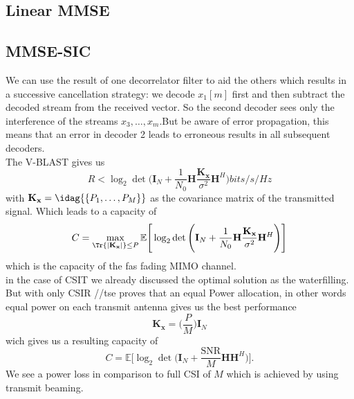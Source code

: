\subsection{Linear MMSE}
\subsection{MMSE-SIC}
We can use the result of one decorrelator filter to aid the others which results in a successive cancellation strategy: we decode $x_1[m]$ first and then subtract the decoded stream from the received vector. So the second decoder sees only the interference of the streams $x_3,\dots,x_m$.But be aware of error propagation, this means that an error in decoder 2 leads to erroneous results in all subsequent decoders.\\
The V-BLAST gives us
\begin{equation}
	R<\log_2{\det{\Biggr(\mathbf{I}_N+\frac{1}{N_0}\mathbf{H}\frac{\mathbf{K_x}}{\sigma^2}\mathbf{H}^H\Biggl)}} bits/s/Hz
\end{equation}
with $\mathbf{K_x} = \idag{\{P_1,\dots,P_M\}}$ as the covariance matrix of the transmitted signal. Which leads to a capacity of
\begin{equation}
	C = \max_{\Tr{|\mathbf{K_x}|}\leq P}{\mathbb{E}\Biggr[\log_2{\det{\Biggr(\mathbf{I}_N+\frac{1}{N_0}\mathbf{H}\frac{\mathbf{K_x}}{\sigma^2}\mathbf{H}^H\Biggl)}}\Biggl]}
\end{equation}
which is the capacity of the fas fading MIMO channel.\\
in the case of CSIT we already discussed the optimal solution as the waterfilling. But with only CSIR //tse proves that an equal Power allocation, in other words equal power on each transmit antenna gives us the best performance
\begin{equation}
	\mathbf{K_x} = \Biggr(\frac{P}{M}\Biggl)\mathbf{I}_N
\end{equation}
wich gives us a resulting capacity of
\begin{equation}
	C = \mathbb{E}\Biggr[\log_2{\det{\Biggr(\mathbf{I}_N+\frac{
	\text{SNR}}{M}\mathbf{HH}^H\Biggl)}}\Biggl].
\end{equation}
We see a power loss in comparison to full CSI of $M$ which is achieved by using transmit beaming.

